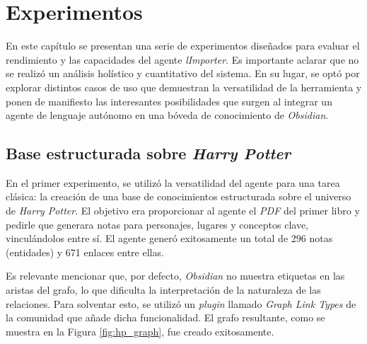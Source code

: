 \chapter{Experimentos}\label{chapter:implementation}
En este capítulo se presentan una serie de experimentos diseñados para evaluar el rendimiento y las capacidades del agente \textit{lImporter}. Es importante aclarar que no se realizó un análisis holístico y cuantitativo del sistema. En su lugar, se optó por explorar distintos casos de uso que demuestran la versatilidad de la herramienta y ponen de manifiesto las interesantes posibilidades que surgen al integrar un agente de lenguaje autónomo en una bóveda de conocimiento de \textit{Obsidian}.

\section{Base estructurada sobre \textit{Harry Potter}}
En el primer experimento, se utilizó la versatilidad del agente para una tarea clásica: la creación de una base de conocimientos estructurada sobre el universo de \textit{Harry Potter}. El objetivo era proporcionar al agente el \textit{PDF} del primer libro y pedirle que generara notas para personajes, lugares y conceptos clave, vinculándolos entre sí. El agente generó exitosamente un total de 296 notas (entidades) y 671 enlaces entre ellas. 


Es relevante mencionar que, por defecto, \textit{Obsidian} no muestra etiquetas en las aristas del grafo, lo que dificulta la interpretación de la naturaleza de las relaciones. Para solventar esto, se utilizó un \textit{plugin} llamado \textit{Graph Link Types} de la comunidad que añade dicha funcionalidad. El grafo resultante, como se muestra en la Figura \ref{fig:hp_graph}, fue creado exitosamente. 

